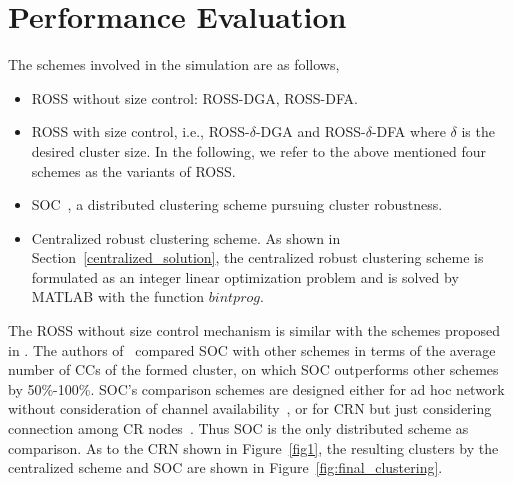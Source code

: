 \documentclass[times]{ettauth}
\newcommand{\ie}{i.e., }
\theoremstyle{mytheoremstyle}
\theoremstyle{mytheoremstyle}
\theoremstyle{mytheoremstyle}
\begin{document}
\section{Performance Evaluation}
\label{performance}
The schemes involved in the simulation are as follows,
\begin{itemize}
\item ROSS without size control: ROSS-DGA, ROSS-DFA.
\item ROSS with size control, \ie ROSS-$\delta$-DGA and ROSS-$\delta$-DFA where $\delta$ is the desired cluster size.
In the following, we refer to the above mentioned four schemes as the variants of ROSS.
\item SOC~\cite{LIU_TMC11_2}, a distributed clustering scheme pursuing cluster robustness.
\item Centralized robust clustering scheme. 
As shown in Section~\ref{centralized_solution}, the centralized robust clustering scheme is formulated as an integer linear optimization problem and is solved by MATLAB with the function $bintprog$.
\end{itemize}

The ROSS without size control mechanism is similar with the schemes proposed in \cite{Li11_ROSS}.
The authors of~\cite{LIU_TMC11_2} compared SOC with other schemes in terms of the average number of CCs of the formed cluster, on which SOC outperforms other schemes by 50\%-100\%. 
SOC's comparison schemes are designed either for ad hoc network without consideration of channel availability~\cite{Basagni99}, or for CRN but just considering connection among CR nodes~\cite{Zhao07}. 
Thus SOC is the only distributed scheme as comparison.
As to the CRN shown in Figure~\ref{fig1}, the resulting clusters by the centralized scheme and SOC are shown in Figure~\ref{fig:final_clustering}.
\end{document}
